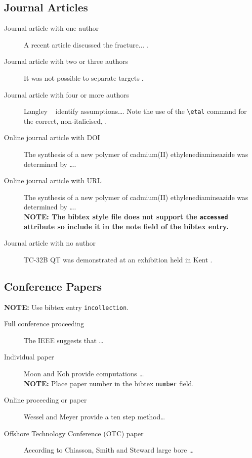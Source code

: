 \documentclass[12pt,oneside]{book} %
\begin{document}
\subsection{Journal Articles}
\label{sec:NumberedJournal}
\begin{description}
\item[Journal article with one author] A recent article discussed the
fracture... \cite{hutchinson_fracture_2010}.
\item[Journal article with two or three authors] It was not possible to separate
targets \cite{yang_perceptual_2016}.
\item[Journal article with four or more authors] Langley \etal~\cite{langley_process_2013} identify assumptions\ldots . Note the use of the \verb#\etal# command for the correct, non-italicised, \etal.
\item[Online journal article with DOI] The synthesis of a new polymer of
cadmium(II) \linebreak ethylenediamineazide was determined by \ldots \cite{yang_preparation_2010}. 
\item[Online journal article with URL] The synthesis of a new polymer of
cadmium(II) \linebreak ethylenediamineazide was determined by \ldots \cite{yang_another_2010}.\\\textbf{NOTE: The bibtex style file does not support the \texttt{accessed} attribute so include it in the note field of the bibtex entry.}
\item[Journal article with no author]  TC-32B QT was demonstrated at an
exhibition held in Kent \cite{anon_first_2005}.
\end{description}

\subsection{Conference Papers}
\label{sec:NumberedConference}
\textbf{NOTE:} Use bibtex entry \texttt{incollection}.
\begin{description}
\item[Full conference proceeding] The IEEE \cite[p.59]{noauthor_11_2010} suggests that \ldots
\item[Individual paper] Moon and Koh \cite{moon_aeroacoustic_2003} provide computations \ldots\\
\textbf{NOTE:} Place paper number in the bibtex \texttt{number} field.
\item[Online proceeding or paper] Wessel and Meyer \cite{wessel_assessing_2010} provide a ten step method\ldots
\item[Offshore Technology Conference (OTC) paper] According to Chiasson, Smith and
Steward \cite{chiasson_large_1999} large bore \ldots
\end{description}
\end{document}
